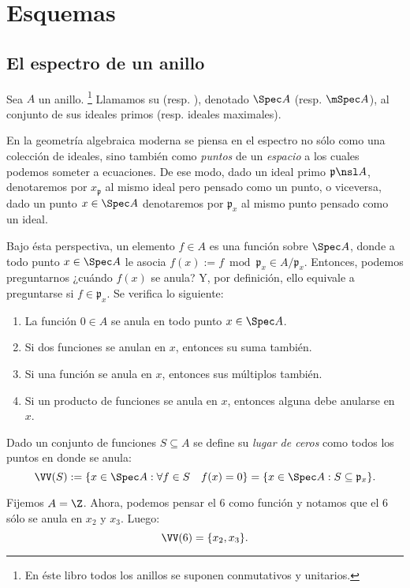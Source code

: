 \chapter{Esquemas}

\section{El espectro de un anillo}

\begin{mydefi}
	Sea $A$ un anillo.%
	\footnote{En éste libro todos los anillos se suponen conmutativos y unitarios.}
	Llamamos su  (resp. ),
	denotado $\Spec A$ (resp. $\mSpec A$), al conjunto de sus ideales primos (resp. ideales maximales).
\end{mydefi}

En la geometría algebraica moderna se piensa en el espectro no sólo como una colección de ideales,
sino también como \textit{puntos} de un \textit{espacio} a los cuales podemos someter a ecuaciones.
De ese modo, dado un ideal primo $\mathfrak{p} \nsl A$, denotaremos por $x_{\mathfrak{p}}$ al mismo ideal pero pensado como un punto,
o viceversa, dado un punto $x \in \Spec A$ denotaremos por $\mathfrak{p}_x$ al mismo punto pensado como un ideal.

Bajo ésta perspectiva, un elemento $f \in A$ es una función sobre $\Spec A$,
donde a todo punto $x \in \Spec A$ le asocia $f(x) := f \bmod{\mathfrak{p}_x} \in A/\mathfrak{p}_x$.
Entonces, podemos preguntarnos ¿cuándo $f (x)$ se anula?
Y, por definición, ello equivale a preguntarse si $f \in \mathfrak{p}_x$. Se verifica lo siguiente:
\begin{enumerate}
	\item La función $0 \in A$ se anula en todo punto $x \in \Spec A$.
	\item Si dos funciones se anulan en $x$, entonces su suma también.
	\item Si una función se anula en $x$, entonces sus múltiplos también.
	\item Si un producto de funciones se anula en $x$, entonces alguna debe anularse en $x$.
\end{enumerate}

\begin{mydef}
	Dado un conjunto de funciones $S \subseteq A$ se define su \textit{lugar de ceros} como todos los puntos en donde se anula:
	$$ \VV(S) := \{ x \in \Spec A : \forall f \in S \quad f (x) = 0 \} = \{ x \in \Spec A : S \subseteq \mathfrak{p}_x \}. $$
\end{mydef}
\begin{ex}
	Fijemos $A = \Z$. Ahora, podemos pensar el 6 como función y notamos que el 6 sólo se anula en $x_2$ y $x_3$. Luego:
	$$ \VV(6) = \{ x_2, x_3 \}. $$
\end{ex}

